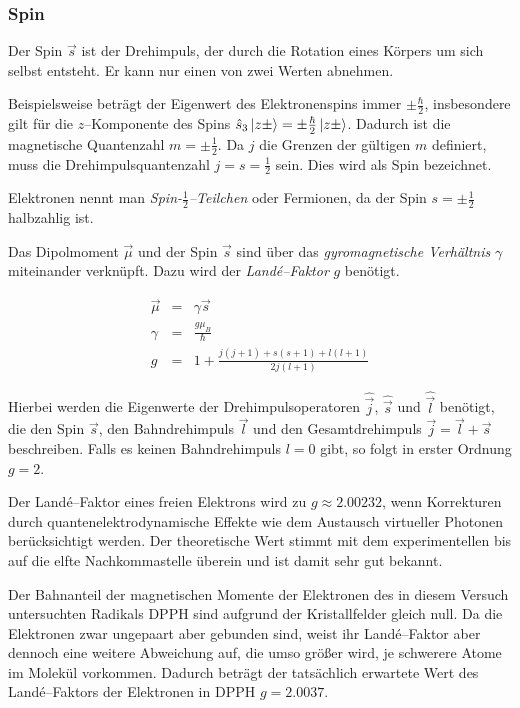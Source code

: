 \documentclass[12pt,a4paper]{scrartcl}
\numberwithin{equation}{section} %
\begin{document}
	
	\hypertarget{spin}{ \subsubsection{Spin}\label{spin}}
	
	Der Spin $\vec s$ ist der Drehimpuls, der durch die Rotation eines Körpers um sich selbst entsteht. Er kann nur einen von zwei Werten abnehmen.
	
	Beispielsweise beträgt der Eigenwert des Elektronenspins immer $\pm\frac{\hbar}{2}$, insbesondere gilt für die $z$--Komponente des Spins $\hat s_3\ket{z\pm}=\pm\frac{\hbar}{2}\ket{z\pm}$. Dadurch ist die magnetische Quantenzahl $m=\pm\frac{1}{2}$. Da $j$ die Grenzen der gültigen $m$ definiert, muss die Drehimpulsquantenzahl $j=s=\frac{1}{2}$ sein. Dies wird als Spin bezeichnet.
	
	Elektronen nennt man \emph{Spin-$\frac{1}{2}$--Teilchen} oder Fermionen, da der Spin $s=\pm\frac{1}{2}$ halbzahlig ist.
	
	Das Dipolmoment $\vec \mu$ und der Spin $\vec s$ sind über das \emph{gyromagnetische Verhältnis} $\gamma$ miteinander verknüpft. Dazu wird der \emph{Landé--Faktor} $g$ benötigt.
	
	\begin{eqnarray}
		\vec \mu &=& \gamma \vec{s} \label{eq:dipolmomentSpin} \\
		\gamma &=& \frac{g\mu_B}{\hbar} \label{eq:gyromag} \\
		g &=& 1 + \frac{j(j+1) + s(s+1) + l(l+1)}{2j(l+1)}
	\end{eqnarray}
	
	\noindent
	Hierbei werden die Eigenwerte der Drehimpulsoperatoren $\hat{\vec j}$, $\hat{\vec s}$ und $\hat{\vec l}$ benötigt, die den Spin $\vec s$, den Bahndrehimpuls $\vec l$ und den Gesamtdrehimpuls $\vec j = \vec l + \vec s$ beschreiben. Falls es keinen Bahndrehimpuls $l=0$ gibt, so folgt in erster Ordnung $g=2$.
	
	Der Landé--Faktor eines freien Elektrons wird zu $g \approx 2.00232$, wenn Korrekturen durch quantenelektrodynamische Effekte wie dem Austausch virtueller Photonen berücksichtigt werden. Der theoretische Wert stimmt mit dem experimentellen bis auf die elfte Nachkommastelle überein und ist damit sehr gut bekannt.
	
	Der Bahnanteil der magnetischen Momente der Elektronen des in diesem Versuch untersuchten Radikals $\mathrm{DPPH}$ sind aufgrund der Kristallfelder gleich null. Da die Elektronen zwar ungepaart aber gebunden sind, weist ihr Land\'e--Faktor aber dennoch eine weitere Abweichung auf, die umso größer wird, je schwerere Atome im Molekül vorkommen. Dadurch beträgt der tatsächlich erwartete Wert des Land\'e--Faktors der Elektronen in $\mathrm{DPPH}$ $g = 2.0037$.
	
\end{document}
